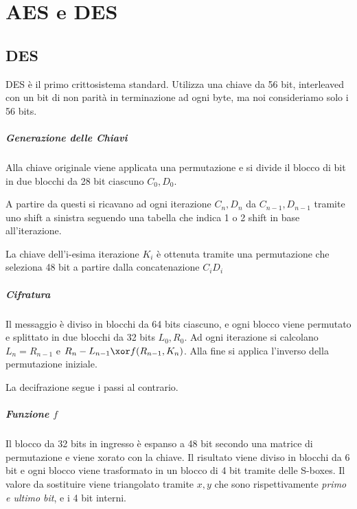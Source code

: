 \chapter{AES e DES}

\section{DES}

DES \`e il primo crittosistema standard. Utilizza una chiave da 56 bit, interleaved con un bit di non parit\`a in terminazione ad ogni byte, ma noi consideriamo solo i 56 bits.

\paragraph{Generazione delle Chiavi}

Alla chiave originale viene applicata una permutazione e si divide il blocco di bit in due blocchi da 28 bit ciascuno $C_0, D_0$.

A partire da questi si ricavano ad ogni iterazione $C_n, D_n$ da $C_{n-1}, D_{n-1}$ tramite uno shift a sinistra seguendo una tabella che indica 1 o 2 shift in base all'iterazione.

La chiave dell'i-esima iterazione $K_i$ \`e ottenuta tramite una permutazione che seleziona 48 bit a partire dalla concatenazione $C_iD_i$

\paragraph{Cifratura}

Il messaggio \`e diviso in blocchi da 64 bits ciascuno, e ogni blocco viene permutato e splittato in due blocchi da 32 bits $L_0, R_0$.
Ad ogni iterazione si calcolano $L_n = R_{n-1}$ e $R_{n} - L_{n-1} \xor f(R_{n-1}, K_n)$. Alla fine si applica l'inverso della permutazione iniziale.

La decifrazione segue i passi al contrario.

\paragraph{Funzione $f$}

Il blocco da 32 bits in ingresso \`e espanso a 48 bit secondo una matrice di permutazione e viene xorato con la chiave. Il risultato viene diviso in blocchi da 6 bit e ogni blocco viene trasformato in un blocco di 4 bit tramite delle S-boxes. Il valore da sostituire viene triangolato tramite $x, y$ che sono rispettivamente \textit{primo e ultimo bit}, e i 4 bit interni.

